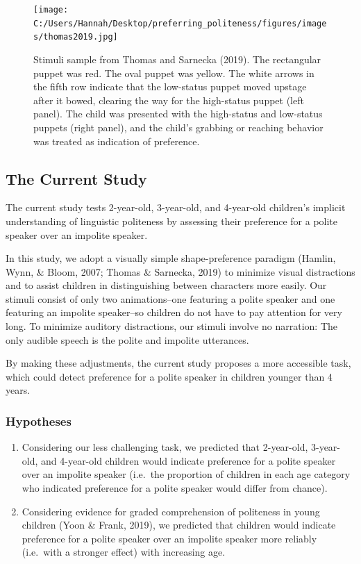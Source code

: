 \documentclass[
  english,
  man,floatsintext]{apa6}
\begin{document}
\begin{figure}
\centering
\texttt{[image: C:/Users/Hannah/Desktop/preferring\_politeness/figures/images/thomas2019.jpg]}
\caption{Stimuli sample from Thomas and Sarnecka (2019). The rectangular puppet was red. The oval puppet was yellow. The white arrows in the fifth row indicate that the low-status puppet moved upstage after it bowed, clearing the way for the high-status puppet (left panel). The child was presented with the high-status and low-status puppets (right panel), and the child's grabbing or reaching behavior was treated as indication of preference.}
\end{figure}

\hypertarget{the-current-study}{%
\subsection{The Current Study}\label{the-current-study}}

The current study tests 2-year-old, 3-year-old, and 4-year-old children's implicit understanding of linguistic politeness by assessing their preference for a polite speaker over an impolite speaker.

In this study, we adopt a visually simple shape-preference paradigm (Hamlin, Wynn, \& Bloom, 2007; Thomas \& Sarnecka, 2019) to minimize visual distractions and to assist children in distinguishing between characters more easily. Our stimuli consist of only two animations--one featuring a polite speaker and one featuring an impolite speaker--so children do not have to pay attention for very long. To minimize auditory distractions, our stimuli involve no narration: The only audible speech is the polite and impolite utterances.

By making these adjustments, the current study proposes a more accessible task, which could detect preference for a polite speaker in children younger than 4 years.

\hypertarget{hypotheses}{%
\subsubsection{Hypotheses}\label{hypotheses}}

\begin{enumerate}
\def\labelenumi{\arabic{enumi}.}
\item
  Considering our less challenging task, we predicted that 2-year-old, 3-year-old, and 4-year-old children would indicate preference for a polite speaker over an impolite speaker (i.e.~the proportion of children in each age category who indicated preference for a polite speaker would differ from chance).
\item
  Considering evidence for graded comprehension of politeness in young children (Yoon \& Frank, 2019), we predicted that children would indicate preference for a polite speaker over an impolite speaker more reliably (i.e.~with a stronger effect) with increasing age.
\end{enumerate}
\end{document}
